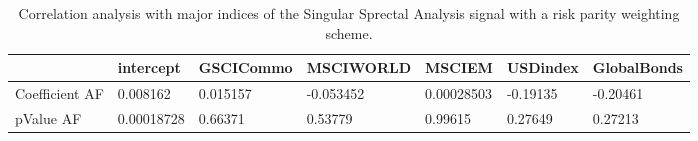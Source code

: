 \begin{table}[H]
\centering
\begin{tabular}{lllllll}
& intercept & GSCICommo & MSCIWORLD & MSCIEM & USDindex & GlobalBonds \\ 
\hline 
Coefficient AF & 0.008162 & 0.015157 & -0.053452 & 0.00028503 & -0.19135 & -0.20461 \\ 
pValue AF & 0.00018728 & 0.66371 & 0.53779 & 0.99615 & 0.27649 & 0.27213 \\ 
\hline
\end{tabular}
\caption{Correlation analysis with major indices of the Singular Sprectal Analysis signal with a risk parity weighting scheme.}
\label{SSA_RP_AFACTOR}
\end{table}